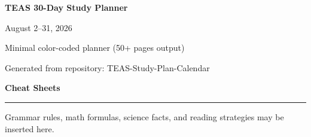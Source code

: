 \documentclass[11pt,a4paper]{article}
\begin{document}

\begin{center}

{\LARGE\bfseries TEAS 30-Day Study Planner}

\vspace{8pt}

{\large August 2--31, 2026}

\vspace{16pt}

{\normalsize Minimal color-coded planner (50+ pages output)}

\vfill

{\small Generated from repository: TEAS-Study-Plan-Calendar}

\end{center}

\newpage


{\Large\textbf{Cheat Sheets}}

\vspace{6pt}

\rule{\linewidth}{0.5pt}

\vspace{10pt}

Grammar rules, math formulas, science facts, and reading strategies may be inserted here.

\newpage


\end{document}
